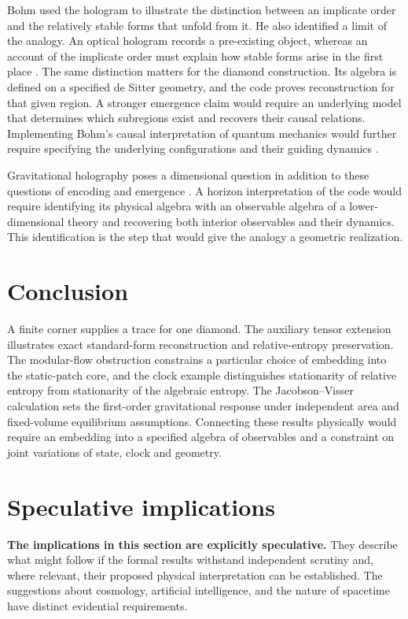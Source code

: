 \documentclass[11pt,a4paper]{article}
\numberwithin{equation}{section}
\theoremstyle{remark}
\begin{document}
Bohm used the hologram to illustrate the distinction between an implicate order and the relatively stable forms that unfold from it. He also identified a limit of the analogy. An optical hologram records a pre-existing object, whereas an account of the implicate order must explain how stable forms arise in the first place \cite{Bohm1985}. The same distinction matters for the diamond construction. Its algebra is defined on a specified de Sitter geometry, and the code proves reconstruction for that given region. A stronger emergence claim would require an underlying model that determines which subregions exist and recovers their causal relations. Implementing Bohm's causal interpretation of quantum mechanics would further require specifying the underlying configurations and their guiding dynamics \cite{Bohm1952}.

Gravitational holography poses a dimensional question in addition to these questions of encoding and emergence \cite{Bousso2002}. A horizon interpretation of the code would require identifying its physical algebra with an observable algebra of a lower-dimensional theory and recovering both interior observables and their dynamics. This identification is the step that would give the analogy a geometric realization.

\section{Conclusion}

A finite corner supplies a trace for one diamond. The auxiliary tensor extension illustrates exact standard-form reconstruction and relative-entropy preservation. The modular-flow obstruction constrains a particular choice of embedding into the static-patch core, and the clock example distinguishes stationarity of relative entropy from stationarity of the algebraic entropy. The Jacobson--Visser calculation sets the first-order gravitational response under independent area and fixed-volume equilibrium assumptions. Connecting these results physically would require an embedding into a specified algebra of observables and a constraint on joint variations of state, clock and geometry.

\section{Speculative implications}
\label{sec:implications}

\textbf{The implications in this section are explicitly speculative.} They describe what might follow if the formal results withstand independent scrutiny and, where relevant, their proposed physical interpretation can be established. The suggestions about cosmology, artificial intelligence, and the nature of spacetime have distinct evidential requirements.
\end{document}
